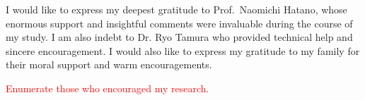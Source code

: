 I would like to express my deepest gratitude to Prof.~Naomichi Hatano, whose enormous support and insightful comments were invaluable during the course of my study. I am also indebt to Dr. Ryo Tamura who provided technical help and sincere encouragement. I would also like to express my gratitude to my family for their moral support and warm encouragements.

\textcolor{red}{Enumerate those who encouraged my research.}